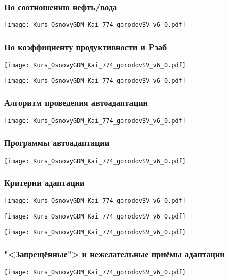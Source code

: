 \documentclass[main.tex]{subfiles}
\begin{document}
\subsubsection{По соотношению нефть/вода}

\texttt{[image: Kurs\_OsnovyGDM\_Kai\_774\_gorodovSV\_v6\_0.pdf]}

\subsubsection{По коэффициенту продуктивности и Pзаб}

\texttt{[image: Kurs\_OsnovyGDM\_Kai\_774\_gorodovSV\_v6\_0.pdf]}

\texttt{[image: Kurs\_OsnovyGDM\_Kai\_774\_gorodovSV\_v6\_0.pdf]}

\subsubsection{Алгоритм проведения автоадаптации}

\texttt{[image: Kurs\_OsnovyGDM\_Kai\_774\_gorodovSV\_v6\_0.pdf]}

\subsubsection{Программы автоадаптации}

\texttt{[image: Kurs\_OsnovyGDM\_Kai\_774\_gorodovSV\_v6\_0.pdf]}

\subsubsection{Критерии адаптации}

\texttt{[image: Kurs\_OsnovyGDM\_Kai\_774\_gorodovSV\_v6\_0.pdf]}

\texttt{[image: Kurs\_OsnovyGDM\_Kai\_774\_gorodovSV\_v6\_0.pdf]}

\texttt{[image: Kurs\_OsnovyGDM\_Kai\_774\_gorodovSV\_v6\_0.pdf]}

\subsubsection{"<Запрещённые"> и нежелательные приёмы адаптации}

\texttt{[image: Kurs\_OsnovyGDM\_Kai\_774\_gorodovSV\_v6\_0.pdf]}
\end{document}
